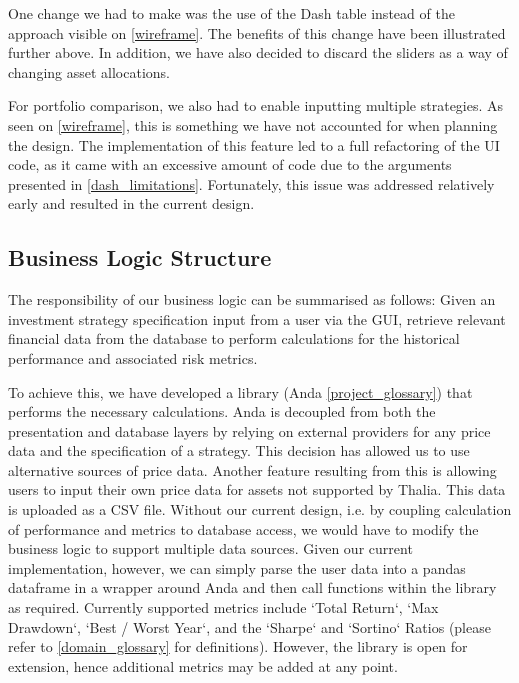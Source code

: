 \documentclass[main.tex]{subfiles}
\begin{document}
One change we had to make was the use of the Dash table instead of the approach visible on \figurename{\ref{wireframe}}. The benefits of this change have been illustrated further above. In addition, we have also decided to discard the sliders as a way of changing asset allocations.

For portfolio comparison, we also had to enable inputting multiple strategies. As seen on \figurename{\ref{wireframe}}, this is something we have not accounted for when planning the design. The implementation of this feature led to a full refactoring of the UI code, as it came with an excessive amount of code due to the arguments presented in \ref{dash_limitations}. Fortunately, this issue was addressed relatively early and resulted in the current design. 

\subsection{Business Logic Structure}
\label{BL Structure}

The responsibility of our business logic can be summarised as follows: Given an investment strategy specification input from a user via the GUI, retrieve relevant financial data from the database to perform calculations for the historical performance and associated risk metrics.

To achieve this, we have developed a library (Anda \ref{project_glossary}) that performs the necessary calculations. Anda is decoupled from both the presentation and database layers by relying on external providers for any price data and the specification of a strategy. This decision has allowed us to use alternative sources of price data.
Another feature resulting from this is allowing users to input their own price data for assets not supported by Thalia. This data is uploaded as a CSV file. Without our current design, i.e. by coupling calculation of performance and metrics to database access, we would have to modify the business logic to support multiple data sources. Given our current implementation, however, we can simply parse the user data into a pandas dataframe in a wrapper around Anda and then call functions within the library as required.
Currently supported metrics include `Total Return`, `Max Drawdown`, `Best / Worst Year`, and the `Sharpe` and `Sortino` Ratios (please refer to \ref{domain_glossary} for definitions). However, the library is open for extension, hence additional metrics may be added at any point.
\end{document}
